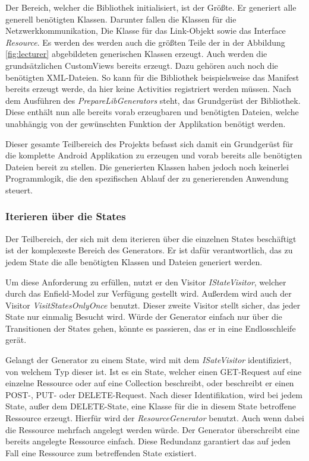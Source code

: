 Der Bereich, welcher die Bibliothek initialisiert, ist der Größte. Er generiert alle generell benötigten Klassen. Darunter fallen die Klassen für die Netzwerkkommunikation, Die Klasse für das Link-Objekt sowie das Interface \textit{Resource}. Es werden des  werden auch die größten Teile der in der Abbildung \ref{fig:lecturer} abgebildeten generischen Klassen erzeugt. Auch werden die grundsätzlichen CustomViews bereits erzeugt. Dazu gehören auch noch die benötigten XML-Dateien. So kann für die Bibliothek beispielsweise das Manifest bereits erzeugt werde, da hier keine Activities registriert werden müssen. Nach dem Ausführen des \textit{PrepareLibGenerators} steht, das Grundgerüst der Bibliothek. Diese enthält nun alle bereits vorab erzeugbaren und benötigten Dateien, welche unabhängig von der gewünschten Funktion der Applikation benötigt werden. 

Dieser gesamte Teilbereich des Projekts befasst sich damit ein Grundgerüst für die komplette Android Applikation zu erzeugen und vorab bereits alle benötigten Dateien bereit zu stellen. Die generierten Klassen haben jedoch noch keinerlei Programmlogik, die den spezifischen Ablauf der zu generierenden Anwendung steuert.

\subsubsection{Iterieren über die States}

Der Teilbereich, der sich mit dem iterieren über die einzelnen States beschäftigt ist der komplexeste Bereich des Generators. Er ist dafür verantwortlich, das zu jedem State die alle benötigten Klassen und Dateien generiert werden. 

Um diese Anforderung zu erfüllen, nutzt er den Visitor \textit{IStateVisitor}, welcher durch das Enfield-Model zur Verfügung gestellt wird. Außerdem wird auch der Visitor \textit{VisitStatesOnlyOnce} benutzt. Dieser zweite Visitor stellt sicher, das jeder State nur einmalig Besucht wird. Würde der Generator einfach nur über die Transitionen der States gehen, könnte es passieren, das er in eine Endlosschleife gerät.

Gelangt der Generator zu einem State, wird mit dem \textit{ISateVisitor} identifiziert, von welchem Typ dieser ist. Ist es ein State, welcher einen GET-Request auf eine einzelne Ressource oder auf eine Collection beschreibt, oder beschreibt er einen POST-, PUT- oder DELETE-Request.  Nach dieser Identifikation, wird bei jedem State, außer dem DELETE-State, eine Klasse für die in diesem State betroffene Ressource erzeugt. Hierfür wird der \textit{ResourceGenerator} benutzt. Auch wenn dabei die Ressource mehrfach angelegt werden würde. Der Generator überschreibt eine bereits angelegte Ressource einfach. Diese Redundanz garantiert das auf jeden Fall eine Ressource zum betreffenden State existiert. 

